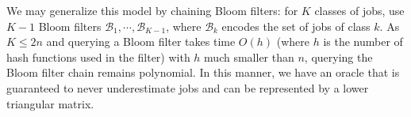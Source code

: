 \documentclass{article}
\begin{document}
We may generalize this model by chaining Bloom filters: for \(K\) classes of jobs, use \(K-1\) Bloom filters
\(\mathcal{B}_1,\cdots,\mathcal{B}_{K-1}\), where \(\mathcal{B}_k\) encodes the set of jobs of class \(k\).
As \(K\le 2n\) and querying a Bloom filter takes time \(O(h)\) (where \(h\) is the number of hash functions
used in the filter) with \(h\) much smaller than \(n\), querying the Bloom filter chain remains polynomial.
In this manner, we have an oracle that is guaranteed to never underestimate jobs and can be represented by a lower
triangular matrix.




\end{document}
